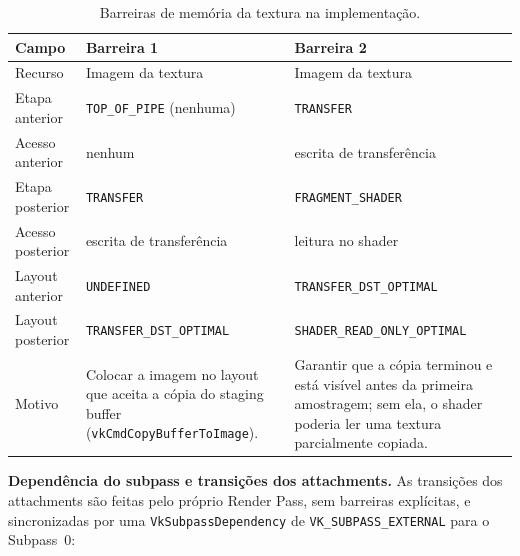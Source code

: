 \begin{table}[H]
\centering
\caption{Barreiras de memória da textura na implementação.}
\label{tab:image-barrier}
\small
\begin{tabular}{p{2.9cm}p{5.2cm}p{5.6cm}}
\toprule
\textbf{Campo} & \textbf{Barreira 1} & \textbf{Barreira 2} \\
\midrule
Recurso & Imagem da textura & Imagem da textura \\
Etapa anterior & \texttt{TOP\_OF\_PIPE} (nenhuma) & \texttt{TRANSFER} \\
Acesso anterior & nenhum & escrita de transferência \\
Etapa posterior & \texttt{TRANSFER} & \texttt{FRAGMENT\_SHADER} \\
Acesso posterior & escrita de transferência & leitura no shader \\
Layout anterior & \texttt{UNDEFINED} & \texttt{TRANSFER\_DST\_OPTIMAL} \\
Layout posterior & \texttt{TRANSFER\_DST\_OPTIMAL} & \texttt{SHADER\_READ\_ONLY\_OPTIMAL} \\
Motivo & Colocar a imagem no layout que aceita a cópia do staging buffer (\texttt{vkCmdCopyBufferToImage}). & Garantir que a cópia terminou e está visível antes da primeira amostragem; sem ela, o shader poderia ler uma textura parcialmente copiada. \\
\bottomrule
\end{tabular}
\end{table}

\textbf{Dependência do subpass e transições dos attachments.} As transições dos attachments são feitas pelo próprio Render Pass, sem barreiras explícitas, e sincronizadas por uma \texttt{VkSubpassDependency} de \texttt{VK\_SUBPASS\_EXTERNAL} para o Subpass~0:

